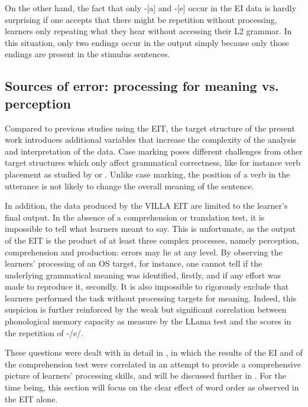 On the other hand, the fact that only -[a] and -[e] occur in the EI data is hardly surprising if one accepts that there might be repetition without processing, learners only repeating what they hear without accessing their L2 grammar. In this situation, only two endings occur in the output simply because only those endings are present in the stimulus sentences.

\subsection{Sources of error: processing for meaning vs. perception}\label{sec:08:2.2}

Compared to previous studies using the EIT, the target structure of the present work introduces additional variables that increase the complexity of the analysis and interpretation of the data. Case marking poses different challenges from other target structures which only affect grammatical correctness, like for instance verb placement as studied by \citet{Håkansson1989} or \citet{Schimke2011}. Unlike case marking, the position of a verb in the utterance is not likely to change the overall meaning of the sentence. 

In addition, the data produced by the VILLA EIT are limited to the learner’s final output. In the absence of a comprehension or translation test, it is impossible to tell what learners meant to say. This is unfortunate, as the output of the EIT is the product of at least three complex processes, namely perception, comprehension and production: errors may lie at any level. By observing the learners’ processing of an OS target, for instance, one cannot tell if the underlying grammatical meaning was identified, firstly, and if any effort was made to reproduce it, secondly. It is also impossible to rigorously exclude that learners performed the task without processing targets for meaning. Indeed, this suspicion is further reinforced by the weak but significant correlation between phonological memory capacity as measure by the LLama test and the scores in the repetition of -/e/.

These questions were dealt with in detail in , in which the results of the EI and of the comprehension test were correlated in an attempt to provide a comprehensive picture of learners’ processing skills, and will be discussed further in . For the time being, this section will focus on the clear effect of word order as observed in the EIT alone.

